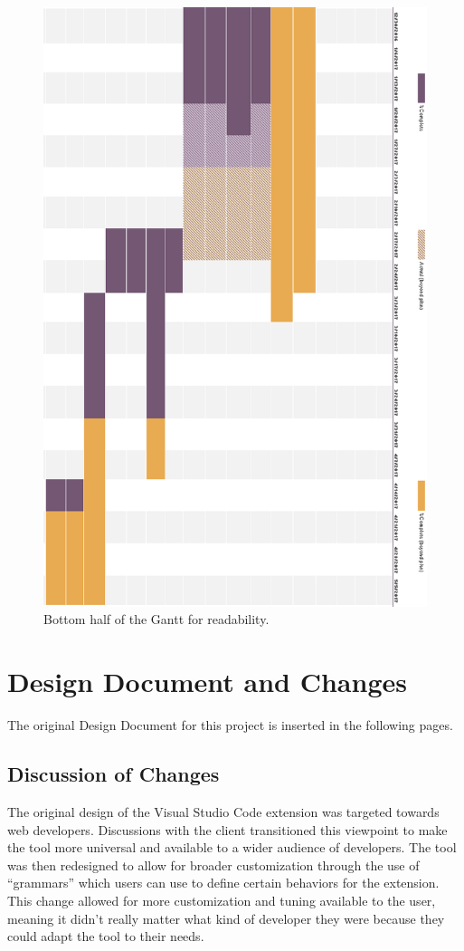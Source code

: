 \documentclass[letterpaper,10pt,titlepage,draftclsnofoot,onecolumn,onesided] {IEEEtran}
\begin{document}
\begin{figure}[H]
	\centering
	\includegraphics[width=.95\textwidth]{GanttBottom}
	\caption{Bottom half of the Gantt for readability.}
\end{figure}

\section{Design Document and Changes}
The original Design Document for this project is inserted in the following pages.

\subsection{Discussion of Changes}
The original design of the Visual Studio Code extension was targeted towards web developers.
Discussions with the client transitioned this viewpoint to make the tool more universal and available to a wider audience of developers.
The tool was then redesigned to allow for broader customization through the use of ``grammars'' which users can use to define certain behaviors for the extension.
This change allowed for more customization and tuning available to the user, meaning it didn't really matter what kind of developer they were because they could adapt the tool to their needs.\\
\end{document}
